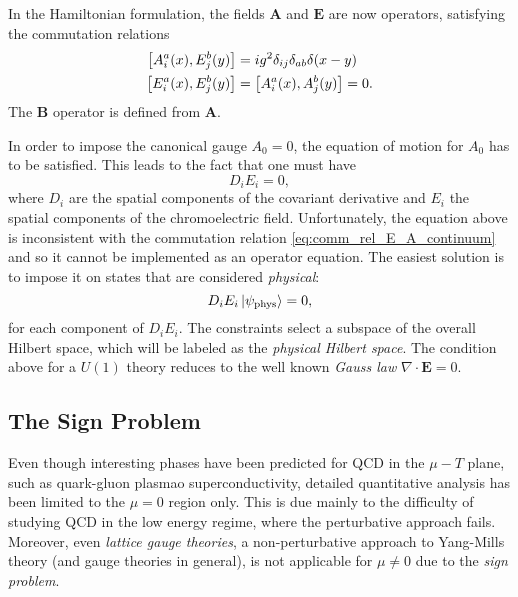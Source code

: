 In the Hamiltonian formulation, the fields $\mathbf{A}$ and $\mathbf{E}$ are now operators, satisfying the commutation relations
\begin{equation}
    \begin{split}
        \comm{A^a_i(x)}{E^b_j(y)} & = i g^2 \delta_{ij} \delta_{ab} \delta(x-y) \\
        \comm{E^a_i(x)}{E^b_j(y)} & = \comm{A^a_i(x)}{A^b_j(y)} = 0.
    \end{split}
    \label{eq:comm_rel_E_A_continuum}
\end{equation}
The $\mathbf{B}$ operator is defined from $\mathbf{A}$.

In order to impose the canonical gauge $A_0 = 0$, the equation of motion for $A_0$ has to be satisfied.
This leads \citneeded to the fact that one must have
\begin{equation}
    D_i E_i = 0,
\end{equation}
where $D_i$ are the spatial components of the covariant derivative and $E_i$ the spatial components of the chromoelectric field.
Unfortunately, the equation above is inconsistent with the commutation relation \eqref{eq:comm_rel_E_A_continuum} and so it cannot be implemented as an operator equation.
The easiest solution is to impose it on states that are considered \emph{physical}:
\begin{equation}
    D_i E_i \ket{\psi_{\text{phys}}} = 0,
\end{equation}
for each component of $D_i E_i$.
The constraints select a subspace of the overall Hilbert space, which will be labeled as the \emph{physical Hilbert space}.
The condition above for a $U(1)$ theory reduces to the well known \emph{Gauss law} $\nabla \cdot \mathbf{E} = 0$.


\subsection{The Sign Problem}
\label{sub:the_sign_problem}

Even though interesting phases have been predicted for QCD in the $\mu - T$ plane\citneeded, such as quark-gluon plasma\citneeded o superconductivity\citneeded, detailed quantitative analysis has been limited to the $\mu = 0$ region only.
This is due mainly to the difficulty of studying QCD in the low energy regime, where the perturbative approach fails\citneeded.
Moreover, even \emph{lattice gauge theories}, a non-perturbative approach to Yang-Mills theory (and gauge theories in general), is not applicable for $\mu \neq 0$ due to the \emph{sign problem}.

